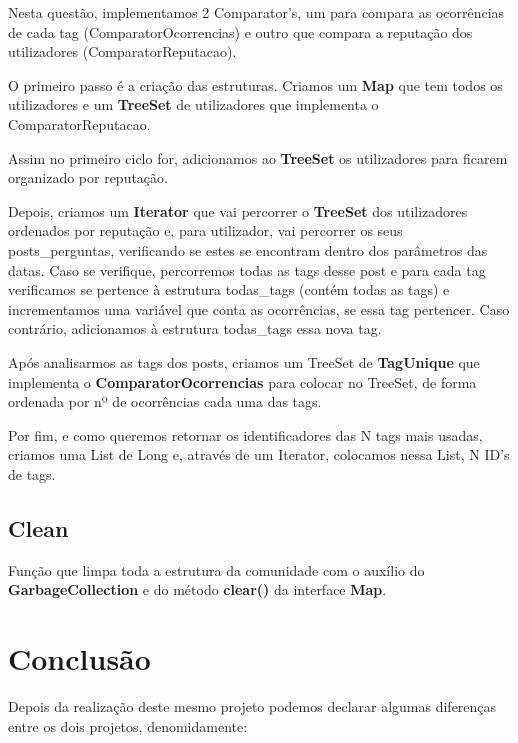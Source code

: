 \documentclass[a4paper]{article}
\begin{document}
Nesta questão, implementamos 2 Comparator's, um para compara as ocorrências de 
cada tag (ComparatorOcorrencias) e outro que compara a reputação dos utilizadores 
(ComparatorReputacao).

O primeiro passo é a criação das estruturas. Criamos um \textbf{Map} que tem todos 
os utilizadores e um \textbf{TreeSet} de utilizadores que implementa o 
ComparatorReputacao.

Assim no primeiro ciclo for, adicionamos ao \textbf{TreeSet} os utilizadores para 
ficarem organizado por reputação.

Depois, criamos um \textbf{Iterator} que vai percorrer o \textbf{TreeSet} dos
utilizadores ordenados por reputação e, para utilizador, vai percorrer os seus
posts\_perguntas, verificando se estes se encontram dentro dos parâmetros das datas.
Caso se verifique, percorremos todas as tags desse post e para cada tag verificamos
se pertence à estrutura todas\_tags (contém todas as tags) e incrementamos uma
variável que conta as ocorrências, se essa tag pertencer. Caso contrário, 
adicionamos à estrutura todas\_tags essa nova tag.

Após analisarmos as tags dos posts, criamos um TreeSet de \textbf{TagUnique} que
implementa o \textbf{ComparatorOcorrencias} para colocar no TreeSet, de forma
ordenada por nº de ocorrências cada uma das tags.

Por fim, e como queremos retornar os identificadores das N tags mais usadas, criamos
uma List de Long e, através de um Iterator, colocamos nessa List, N ID's de tags.

\subsection{Clean}

Função que limpa toda a estrutura da comunidade com o auxílio do 
\textbf{GarbageCollection} e do método \textbf{clear()} da interface \textbf{Map}.

\section{Conclusão}
\label{sec:conclusao} 

Depois da realização deste mesmo projeto podemos declarar algumas diferenças
entre os dois projetos, denomidamente:
\end{document}
